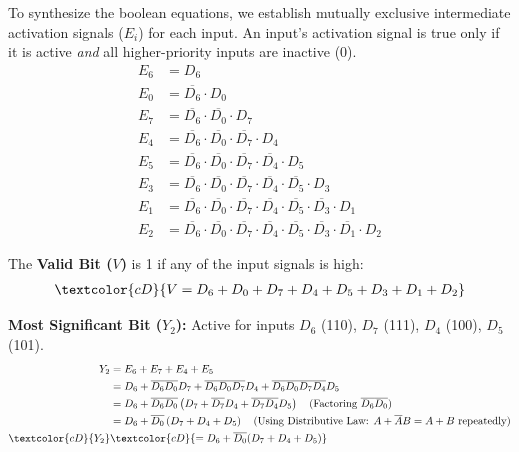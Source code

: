 \documentclass[12pt,a3paper]{article}
\begin{document}
\begin{enumerate}
\begin{tcolorbox}[enhanced,breakable,ansbox,colback=cD!4,colframe=cD,boxrule=0.8pt,arc=5pt,title={\textbf{Answer}},fonttitle=\bfseries\color{white},colbacktitle=cD]
To synthesize the boolean equations, we establish mutually exclusive intermediate activation signals ($E_i$) for each input. An input's activation signal is true only if it is active \textit{and} all higher-priority inputs are inactive (0).
\begin{align*}
    E_6 &= D_6 \\
    E_0 &= \overline{D_6} \cdot D_0 \\
    E_7 &= \overline{D_6} \cdot \overline{D_0} \cdot D_7 \\
    E_4 &= \overline{D_6} \cdot \overline{D_0} \cdot \overline{D_7} \cdot D_4 \\
    E_5 &= \overline{D_6} \cdot \overline{D_0} \cdot \overline{D_7} \cdot \overline{D_4} \cdot D_5 \\
    E_3 &= \overline{D_6} \cdot \overline{D_0} \cdot \overline{D_7} \cdot \overline{D_4} \cdot \overline{D_5} \cdot D_3 \\
    E_1 &= \overline{D_6} \cdot \overline{D_0} \cdot \overline{D_7} \cdot \overline{D_4} \cdot \overline{D_5} \cdot \overline{D_3} \cdot D_1 \\
    E_2 &= \overline{D_6} \cdot \overline{D_0} \cdot \overline{D_7} \cdot \overline{D_4} \cdot \overline{D_5} \cdot \overline{D_3} \cdot \overline{D_1} \cdot D_2
\end{align*}

The \textbf{Valid Bit ($V$)} is 1 if any of the input signals is high:
\begin{align*}
    \textcolor{cD}{V = D_6 + D_0 + D_7 + D_4 + D_5 + D_3 + D_1 + D_2}
\end{align*}

\textbf{Most Significant Bit ($Y_2$):} Active for inputs $D_6$ (110), $D_7$ (111), $D_4$ (100), $D_5$ (101).
\begin{align*}
    Y_2 &= E_6 + E_7 + E_4 + E_5 \\
    &= D_6 + \overline{D_6}\overline{D_0}D_7 + \overline{D_6}\overline{D_0}\overline{D_7}D_4 + \overline{D_6}\overline{D_0}\overline{D_7}\overline{D_4}D_5 \\
    &= D_6 + \overline{D_6}\overline{D_0} \left( D_7 + \overline{D_7}D_4 + \overline{D_7}\overline{D_4}D_5 \right) \quad \text{(Factoring $\overline{D_6}\overline{D_0}$)} \\
    &= D_6 + \overline{D_0} \left( D_7 + D_4 + D_5 \right) \quad \text{(Using Distributive Law: $A + \overline{A}B = A + B$ repeatedly)} \\
    \textcolor{cD}{Y_2} &\textcolor{cD}{= D_6 + \overline{D_0} (D_7 + D_4 + D_5)}
\end{align*}


\end{tcolorbox}
\end{enumerate}
\end{document}
